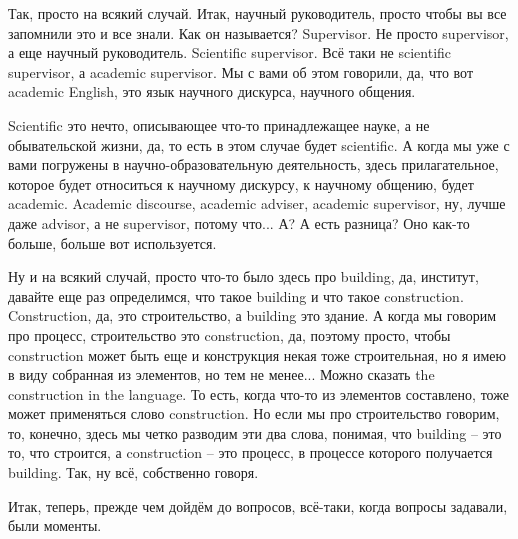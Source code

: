 \documentclass[main.tex]{subfiles}
\begin{document}
Так, просто на всякий случай.
Итак, научный руководитель, просто чтобы вы все запомнили это и все знали.
Как он называется? Supervisor.
Не просто supervisor, а еще научный руководитель.
Scientific supervisor.
Всё таки не scientific supervisor, а academic supervisor.
Мы с вами об этом говорили, да, что вот academic English, это язык научного дискурса, научного общения.

Scientific это нечто, описывающее что-то принадлежащее науке, а не обывательской жизни, да, то есть в этом случае будет scientific.
А когда мы уже с вами погружены в научно-образовательную деятельность, здесь прилагательное, которое будет относиться к научному дискурсу, к научному общению, будет academic.
Academic discourse, academic adviser, academic supervisor, ну, лучше даже advisor, а не supervisor, потому что...
А? А есть разница? Оно как-то больше, больше вот используется.


Ну и на всякий случай, просто что-то было здесь про building, да, институт, давайте еще раз определимся, что такое building и что такое construction.
Construction, да, это строительство, а building это здание.
А когда мы говорим про процесс, строительство это construction, да, поэтому просто, чтобы construction может быть еще и конструкция некая тоже строительная, но я имею в виду собранная из элементов, но тем не менее...
Можно сказать the construction in the language.
То есть, когда что-то из элементов составлено, тоже может применяться слово construction.
Но если мы про строительство говорим, то, конечно, здесь мы четко разводим эти два слова, понимая, что building -- это то, что строится, а construction -- это процесс, в процессе которого получается building.
Так, ну всё, собственно говоря.


Итак, теперь, прежде чем дойдём до вопросов, всё-таки, когда вопросы задавали, были моменты.
\end{document}
